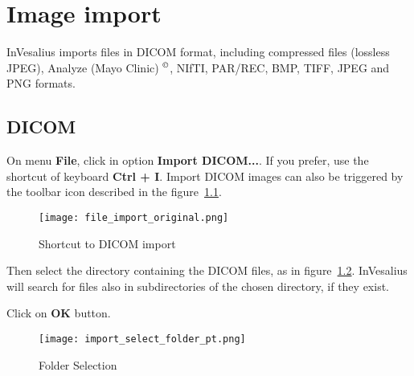 \chapter{Image import}


InVesalius imports files in DICOM format, including compressed files (lossless JPEG), Analyze (Mayo Clinic) $^\copyright$, NIfTI, PAR/REC, BMP, TIFF, JPEG and PNG formats.

\section{DICOM}


On menu \textbf{File}, click in option \textbf{Import DICOM...}. If you prefer, use the shortcut of keyboard \textbf{Ctrl + I}. Import DICOM images can also be triggered by the toolbar icon described in the figure~\ref{fig:import}.

\begin{figure}[!htb]
\centering
\texttt{[image: file\_import\_original.png]}
\caption{Shortcut to DICOM import}
\label{fig:import}
\end{figure}

\hspace{.2cm}


Then select the directory containing the DICOM files, as in figure~\ref{fig:win_folder}.
InVesalius will search for files also in subdirectories of the chosen directory, if they exist.


\newpage

Click on \textbf{OK} button.

\begin{figure}[!htb]
\centering
\texttt{[image: import\_select\_folder\_pt.png]}
\caption{Folder Selection}
\label{fig:win_folder}
\end{figure}

